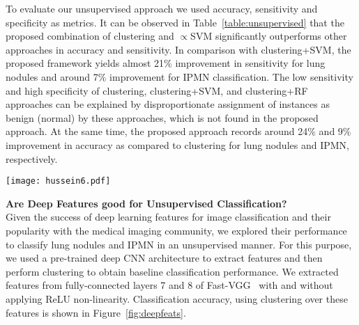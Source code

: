 \documentclass[journal]{IEEEtran}
\begin{document}
To evaluate our unsupervised approach we used accuracy, sensitivity and specificity as metrics. It can be observed in Table~\ref{table:unsupervised} that the proposed combination of clustering and $\propto$SVM significantly outperforms other approaches in accuracy and sensitivity. In comparison with clustering+SVM, the proposed framework yields almost 21\% improvement in sensitivity for lung nodules and around 7\% improvement for IPMN classification. The low sensitivity and high specificity of clustering, clustering+SVM, and clustering+RF approaches can be explained by disproportionate assignment of instances as benign (normal) by these approaches, which is not found in the proposed approach. At the same time, the proposed approach records around 24\% and 9\% improvement in accuracy as compared to clustering for lung nodules and IPMN, respectively. \\

\begin{figure*}[t]
\centering
\texttt{[image: hussein6.pdf]}
\caption{Influence of deep learning features obtained from different layers of a VGG network with and without ReLU non-linearities. The graph on the left shows accuracy, sensitivity and specificity for unsupervised lung nodule classification (clustering), whereas the right one shows the corresponding results for IPMN.}
\label{fig:deepfeats}
\end{figure*}

\noindent\textbf{Are Deep Features good for Unsupervised Classification?}\\
\noindent Given the success of deep learning features for image classification and their popularity with the medical imaging community, we explored their performance to classify lung nodules and IPMN in an unsupervised manner. For this purpose, we used a pre-trained deep CNN architecture to extract features and then perform clustering to obtain baseline classification performance. We extracted features from fully-connected layers 7 and 8 of Fast-VGG~\cite{VGG} with and without applying ReLU non-linearity. Classification accuracy, using clustering over these features is shown in Figure~\ref{fig:deepfeats}.
\end{document}
